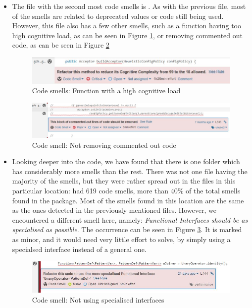 \begin{itemize}
                \item The file with the second most code smells is 
                . As with the previous file, most of the smells are related to deprecated values or code still being used. However, this file also has a few other smells, such as a function having too high cognitive load, as can be seen in Figure \ref{fig:smells2}, or removing commented out code, as can be seen in Figure \ref{fig:smells1}
                \begin{figure}[H]
                    \centering
                    \includegraphics[scale=1.4]{figures/smell2.JPG}
                    \caption{Code smells: Function with a high cognitive load}
                    \label{fig:smells2}
                \end{figure}
                \begin{figure}[H]
                    \centering
                    \includegraphics[scale=1.2]{figures/smell1.JPG}
                    \caption{Code smell: Not removing commented out code}
                    \label{fig:smells1}
                \end{figure}
                \item Looking deeper into the code, we have found that there is one folder which has considerably more smells than the rest. There was not one file having the majority of the smells, but they were rather spread out in the files in this particular location: 
                 had 619 code smells, more than 40\% of the total smells found in the  package. Most of the smells found in this location are the same as the ones detected in the previously mentioned files. However, we encountered a different smell here, namely: \textit{Functional Interfaces should be as specialised as possible}. The occurrence can be seen in Figure \ref{fig:smell5}. It is marked as minor, and it would need very little effort to solve, by simply using a specialsed interface instead of a general one.
                \begin{figure}[H]
                    \centering
                    \includegraphics[scale=1.5]{figures/smell5.JPG}
                    \caption{Code smell: Not using specialised interfaces}
                    \label{fig:smell5}
                \end{figure}
            \end{itemize}
            
